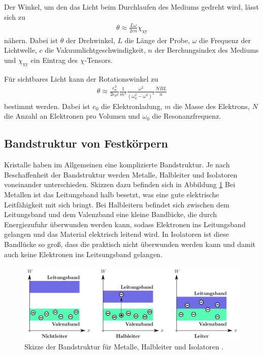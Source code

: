 Der Winkel, um den das Licht beim Durchlaufen des Mediums gedreht wird, lässt sich zu
\begin{align}
  \theta \approx \frac{L \omega}{2 c n}\chi_{\mathrm{xy}}
  \label{eqn:theta1}
\end{align}
nähern. Dabei ist $\theta$ der Drehwinkel, $L$ die Länge der Probe, $\omega$ die Frequenz
der Lichtwelle, $c$ die Vakuumlichtgeschwindigkeit, $n$ der Berchungsindex des Mediums
und $\chi_{\mathrm{xy}}$ ein Eintrag des $\chi$-Tensors.

Für sichtbares Licht kann der Rotationswinkel zu
\begin{align}
  \theta \approx \frac{e^3_0}{2 \epsilon_0 c} \frac{1}{m^2}\frac{\omega^2}{(\omega^2_0 - \omega^2)^2} \frac{NBL}{n}
  \label{eqn:theta2}
\end{align}
bestimmt werden. Dabei ist $e_0$ die Elektronladung, $m$ die Masse des Elektrons, $N$
die Anzahl an Elektronen pro Volumen und $\omega_0$ die Resonanzfrequenz.


\subsection{Bandstruktur von Festkörpern}
\label{subsec:bandstruktur}

Kristalle haben im Allgemeinen eine komplizierte Bandstruktur. Je nach Beschaffenheit
der Bandstruktur werden Metalle, Halbleiter und Isolatoren voneinander unterschieden.
Skizzen dazu befinden sich in Abbildung \ref{fig:bandstruktur}
Bei Metallen ist das Leitungsband halb besetzt, was eine gute elektrische Leitfähigkeit
mit sich bringt. Bei Halbleitern befindet sich zwischen dem Leitungsband und dem
Valenzband eine kleine Bandlücke, die durch Energiezufuhr überwunden
werden kann, sodass Elektronen ins Leitungsband gelangen und das Material elektrisch
leitend wird. In Isolatoren ist diese Bandlücke so groß, dass die praktisch nicht
überwunden werden kann und damit auch keine Elektronen ins Leitsungsband gelangen.

\begin{figure}[h!]
  \centering
  \includegraphics[width=\textwidth]{data/bandstruktur.png}
  \caption{Skizze der Bandstruktur für Metalle, Halbleiter und Isolatoren \cite{wiki}.}
  \label{fig:bandstruktur}
\end{figure}

